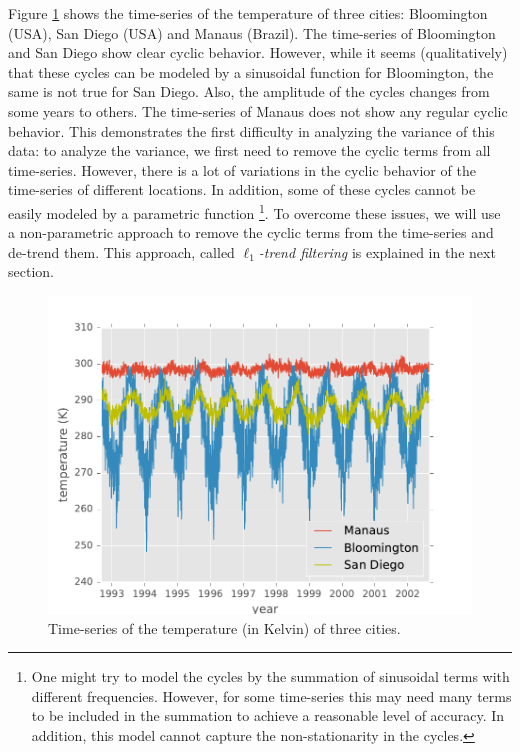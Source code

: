 \documentclass[review]{elsarticle}
\begin{document}
Figure \ref{fig:cities_ts} shows the time-series of the temperature of three cities: Bloomington (USA), San Diego (USA) and Manaus (Brazil). The time-series of Bloomington and San Diego show clear cyclic behavior. However, while it seems (qualitatively) that these cycles can be modeled by a sinusoidal function for Bloomington, the same is not true for San Diego. Also, the amplitude of the cycles changes from some years to others. The time-series of Manaus does not show any regular cyclic behavior. This demonstrates the first difficulty in analyzing the variance of this data: to analyze the variance, we first need to remove the cyclic terms from all time-series. However, there is a lot of variations in the cyclic behavior of the time-series of different locations. In addition, some of these cycles cannot be easily modeled by a parametric function \footnote{One might try to model the cycles by the summation of sinusoidal terms with different frequencies. However, for some time-series this may need many terms to be included in the summation to achieve a reasonable level of accuracy. In addition, this model cannot capture the non-stationarity in the cycles.}. To overcome these issues, we will use a non-parametric approach to remove the cyclic terms from the time-series and de-trend them. This approach, called \textit{$\ell_1$-trend filtering} is explained in the next section.

\begin{figure}[ht]
	\vskip 0.2in
	\begin{center}
		\centerline{\includegraphics[width=\columnwidth]{Figures/cities_ts}}
		\caption{Time-series of the temperature (in Kelvin) of three cities.}
		\label{fig:cities_ts}
	\end{center}
	\vskip -0.2in
\end{figure} 
\end{document}
